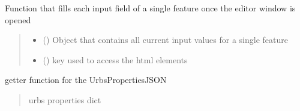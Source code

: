 \documentclass[letterpaper,10pt,english]{sphinxmanual}
\begin{document}
\begin{fulllineitems}
\label{\detokenize{docs_gui/js_api/urbs_editor/generate_urbs_setup_editor:fillSelectedFeatureEditorFields}}
\pysigstartsignatures
{}
\pysigstopsignatures
\sphinxAtStartPar
Function that fills each input field of a single feature once the editor window is opened
\begin{quote}\begin{description}
\begin{itemize}
\item {} 
\sphinxAtStartPar
{} () \textendash{} Object that contains all current input values for a single feature

\item {} 
\sphinxAtStartPar
{} () \textendash{} key used to access the html elements

\end{itemize}

\end{description}\end{quote}

\end{fulllineitems}


\begin{fulllineitems}
\label{\detokenize{docs_gui/js_api/urbs_editor/generate_urbs_setup_editor:getUrbsPropertiesJSON}}
\pysigstartsignatures
{}
\pysigstopsignatures
\sphinxAtStartPar
getter function for the UrbsPropertiesJSON
\begin{quote}\begin{description}
\sphinxAtStartPar
urbs properties dict

\end{description}\end{quote}

\end{fulllineitems}
\end{document}
